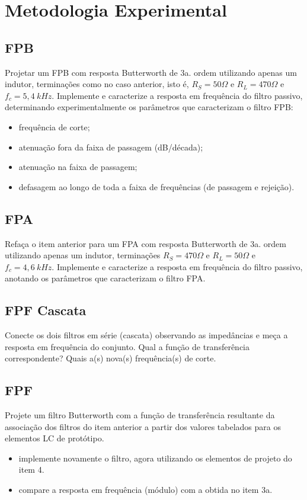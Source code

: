 
\newpage

\section{Metodologia Experimental}

\subsection{FPB}

Projetar um FPB com resposta Butterworth de 3a. ordem utilizando apenas um 
indutor, terminações como no caso anterior, isto é, $R_S = 50 \Omega$ e $R_L = 
470 \Omega$ e $f_c = 5,4 \ kHz$. Implemente e caracterize a resposta em 
frequência do filtro passivo, determinando experimentalmente os parâmetros que 
caracterizam o filtro FPB:

\begin{itemize}
  \item frequência de corte;
  \item atenuação fora da faixa de passagem (dB/década);
  \item atenuação na faixa de passagem;
  \item defasagem ao longo de toda a faixa de frequências (de passagem e 
  rejeição).
\end{itemize}

\subsection{FPA}

Refaça o item anterior para um FPA com resposta Butterworth de
3a. ordem utilizando apenas um indutor, terminações $R_S = 470\Omega$ e $R_L = 
50\Omega$ e $f_c = 4,6 \ kHz$. Implemente e caracterize a resposta em 
frequência do filtro passivo, anotando os parâmetros que caracterizam o filtro 
FPA.

\subsection{FPF Cascata}
Conecte os dois filtros em série (cascata) observando as impedâncias e meça a 
resposta em frequência do conjunto. Qual a função de transferência 
correspondente? Quais a(s) nova(s) frequência(s) de corte.

\subsection{FPF}
Projete um filtro Butterworth com a função de transferência resultante da 
associação dos filtros do item anterior a partir dos valores tabelados para os
elementos LC de protótipo.

\begin{itemize}
  \item implemente novamente o filtro, agora utilizando os elementos de projeto 
  do item 4.
  \item compare a resposta em frequência (módulo) com a obtida no item 3a.
\end{itemize}